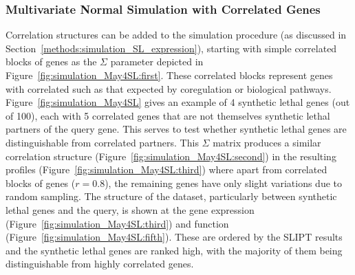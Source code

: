 \FloatBarrier

\subsubsection{Multivariate Normal Simulation with Correlated Genes} \label{chapt2:simulation_mvtnorm_cor}

Correlation structures can be added to the simulation procedure (as discussed in Section~\ref{methods:simulation_SL_expression}), starting with simple correlated blocks of genes as the $\Sigma$ parameter depicted in Figure~\ref{fig:simulation_May4SL:first}. These correlated blocks represent genes with correlated  such as that expected by coregulation or biological pathways. Figure~\ref{fig:simulation_May4SL} gives an example of 4 \gls{synthetic lethal} genes (out of 100), each with 5 correlated genes that are not themselves \gls{synthetic lethal} partners of the query gene. This serves to test whether \gls{synthetic lethal} genes are distinguishable from correlated partners. This $\Sigma$ matrix produces a similar correlation structure (Figure~\ref{fig:simulation_May4SL:second}) in the resulting  profiles (Figure~\ref{fig:simulation_May4SL:third}) where apart from correlated blocks of genes ($r = 0.8$), the remaining genes have only slight variations due to random sampling. The structure of the dataset, particularly between \gls{synthetic lethal} genes and the query, is shown at the \gls{gene expression} (Figure~\ref{fig:simulation_May4SL:third}) and function (Figure~\ref{fig:simulation_May4SL:fifth}). These are ordered by the \gls{SLIPT} results and the \gls{synthetic lethal} genes are ranked high, with the majority of them being distinguishable from highly correlated genes.

